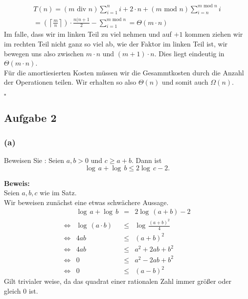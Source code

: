 \documentclass[11pt,a4paper,ngerman]{article}
\begin{document}
{   $$\begin{array}{rcl}
      T(n) = (m \text{ div } n) \sum_{i=1}^n i + 2 \cdot n + (m \text{ mod } n) \sum_{i=n}^{m \text{ mod } n} i\\
           = (\left\lceil \frac{m}{n} \right\rceil) \cdot \frac{n(n+1}{2} - \sum_{i=1}^{m \text{ mod } n}
           = \Theta (m \cdot n)
   \end{array}$$
   Im falle, dass wir im linken Teil zu viel nehmen und auf $+1$ kommen ziehen wir im rechten Teil nicht ganz so viel ab, wie der Faktor im linken Teil ist,
   wir bewegen uns also zwischen $m \cdot n$ und $(m+1) \cdot n$. Dies liegt eindeutig in $\Theta(m\cdot n)$.\\

   Für die amortiesierten Kosten müssen wir die Gesammtkosten durch die Anzahl der Operationen teilen. Wir erhalten so also $\Theta(n)$ und somit auch $\Omega(n)$.

   \mbox{}\hfill$\square$








\subsection*{Aufgabe 2}

\subsubsection*{(a)}
Beweisen Sie : Seien $a,b > 0$ und $c \geq a+ b$. Dann ist
$$
   \log \, a + \log \, b \leq 2 \log \, c - 2.
$$

\noindent\textbf{Beweis:}\\
Seien $a,b,c$ wie im Satz.\\

Wir beweisen zunächst eine etwas schwächere Aussage.
$$\begin{array}{crcl}
   & \log \, a + \log \,b &=& 2 \log \, (a+b) - 2\\
\Leftrightarrow & \log \, (a\cdot b) &\leq & \log \, \frac{(a+b)^2}{4}\\
\Leftrightarrow & 4ab & \leq & (a+b)^2\\
\Leftrightarrow & 4ab & \leq & a^2 + 2ab + b^2\\
\Leftrightarrow & 0 & \leq & a^2 - 2ab + b^2\\
\Leftrightarrow & 0 & \leq & (a-b)^2
\end{array}$$
Gilt trivialer weise, da das quadrat einer rationalen Zahl immer größer oder gleich $0$ ist.

}
\end{document}
